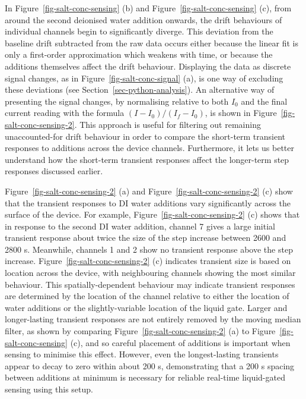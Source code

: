 \documentclass[
  a4paper,
]{scrbook}
\begin{document}
In Figure~\ref{fig-salt-conc-sensing} (b) and
Figure~\ref{fig-salt-conc-sensing} (c), from around the second deionised
water addition onwards, the drift behaviours of individual channels
begin to significantly diverge. This deviation from the baseline drift
subtracted from the raw data occurs either because the linear fit is
only a first-order approximation which weakens with time, or because the
additions themselves affect the drift behaviour. Displaying the data as
discrete signal changes, as in Figure~\ref{fig-salt-conc-signal} (a), is
one way of excluding these deviations (see
Section~\ref{sec-python-analysis}). An alternative way of presenting the
signal changes, by normalising relative to both \(I_{0}\) and the final
current reading with the formula \((I - I_{0})/(I_{f} - I_{0})\), is
shown in Figure~\ref{fig-salt-conc-sensing-2}. This approach is useful
for filtering out remaining unaccounted-for drift behaviour in order to
compare the short-term transient responses to additions across the
device channels. Furthermore, it lets us better understand how the
short-term transient responses affect the longer-term step responses
discussed earlier.

Figure~\ref{fig-salt-conc-sensing-2} (a) and
Figure~\ref{fig-salt-conc-sensing-2} (c) show that the transient
responses to DI water additions vary significantly across the surface of
the device. For example, Figure~\ref{fig-salt-conc-sensing-2} (c) shows
that in response to the second DI water addition, channel 7 gives a
large initial transient response about twice the size of the step
increase between 2600 and 2800 s. Meanwhile, channels 1 and 2 show no
transient response above the step increase.
Figure~\ref{fig-salt-conc-sensing-2} (c) indicates transient size is
based on location across the device, with neighbouring channels showing
the most similar behaviour. This spatially-dependent behaviour may
indicate transient responses are determined by the location of the
channel relative to either the location of water additions or the
slightly-variable location of the liquid gate. Larger and longer-lasting
transient responses are not entirely removed by the moving median
filter, as shown by comparing Figure~\ref{fig-salt-conc-sensing-2} (a)
to Figure~\ref{fig-salt-conc-sensing} (c), and so careful placement of
additions is important when sensing to minimise this effect. However,
even the longest-lasting transients appear to decay to zero within about
200 s, demonstrating that a 200 s spacing between additions at minimum
is necessary for reliable real-time liquid-gated sensing using this
setup.
\end{document}
